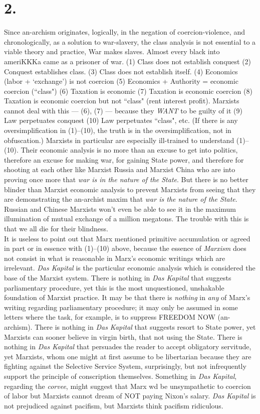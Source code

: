 \section*{2.}
Since an-archism originates, logically, in the negation of coercion-violence, and chronologically, as a solution to war-slavery, the class analysis is not essential to a viable theory and practice, War makes slaves. Almost every black into ameriKKKa came as a prisoner of war. (1) Class does not establish conquest (2) Conquest establishes class. (3) Class does not establish itself. (4) Economics (labor + `exchange') is not coercion (5) Economics + Authority  = economic coercion (``class") (6) Taxation is economic (7) Taxation is economic coercion (8) Taxation is economic coercion but not ``class" (rent interest profit). Marxists cannot deal with this --- (6), (7) --- because they \emph{WANT} to be guilty of it (9) Law perpetuates conquest (10) Law perpetuates ``class", etc. (If there is any oversimplification in (1)--(10), the truth is in the oversimplification, not in obfuscation.) Marxists in particular are especially ill-trained to understand (1)--(10). Their economic analysis is no more than an excuse to get into politics, therefore an excuse for making war, for gaining State power, and therefore for shooting at each other like Marxist Russia and Marxist China who are into proving once more that \emph{war is in the nature of the State}. But there is no better blinder than Marxist economic analysis to prevent Marxists from seeing that they are demonstrating the an-archist maxim that \emph{war is the nature of the State}. Russian and Chinese Marxists won't even be able to see it in the maximum illumination of mutual exchange of a million megatons. The trouble with this is that we all die for their blindness.\\
It is useless to point out that Marx mentioned primitive accumulation or agreed in part or in essence with (1)--(10) above, because the essence of \emph{Marxism} does not consist in what is reasonable in Marx's economic writings which are irrelevant. \emph{Das Kapital} is the particular economic analysis which is considered the base of the Marxist system. There is nothing in \emph{Das Kapital} that suggests parliamentary procedure, yet this is the most unquestioned, unshakable foundation of Marxist practice. It may be that there is \emph{nothing} in \emph{any} of Marx's writing regarding parliamentary procedure; it may only be assumed in some letters where the task, for example, is to suppress FREEDOM NOW (an-archism). There is nothing in \emph{Das Kapital} that suggests resort to State power, yet Marxists can sooner believe in virgin birth, that not using the State. There is nothing in \emph{Das Kapital} that persuades the reader to accept obligatory servitude, yet Marxists, whom one might at first assume to be libertarian because they are fighting against the Selective Service System, surprisingly, but not infrequently support the principle of conscription themselves. Something in \emph{Das Kapital}, regarding the \emph{corvee}, might suggest that Marx wd be unsympathetic to coercion of labor but Marxists cannot dream of NOT paying Nixon's salary. \emph{Das Kapital} is not prejudiced against pacifism, but Marxists think pacifism ridiculous.\\
